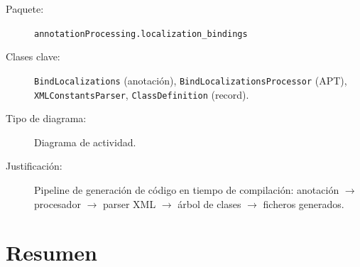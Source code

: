 \documentclass[11pt,a4paper]{article}
\newcommand{\code}[1]{\texttt{#1}}
\newcommand{\pkg}[1]{\texttt{\small #1}}
\begin{document}
\begin{description}
  \item[Paquete:] \pkg{annotationProcessing.localization\_bindings}
  \item[Clases clave:] \code{BindLocalizations} (anotaci\'on),
        \code{BindLocalizationsProcessor} (APT),
        \code{XMLConstantsParser}, \code{ClassDefinition} (record).
  \item[Tipo de diagrama:] Diagrama de actividad.
  \item[Justificaci\'on:] Pipeline de generaci\'on de c\'odigo en
        tiempo de compilaci\'on: anotaci\'on $\to$ procesador $\to$
        parser XML $\to$ \'arbol de clases $\to$ ficheros generados.
\end{description}

\section{Resumen}
\end{document}
